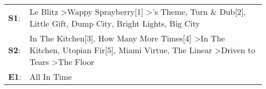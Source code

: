 \begin{supertabular}{p{0.03\textwidth}p{0.92\textwidth}}
 \textbf{S1}:  &                                                              Le Blitz\textsuperscript{} \textgreater \enspace Wappy Sprayberry[1]\textsuperscript{} \textgreater {}'s Theme\textsuperscript{}, \enspace Turn \& Dub[2]\textsuperscript{}, \enspace Little Gift\textsuperscript{}, \enspace Dump City\textsuperscript{}, \enspace Bright Lights, Big City\textsuperscript{}  \enspace  \\
 \textbf{S2}:  &  In The Kitchen[3]\textsuperscript{}, \enspace How Many More Times[4]\textsuperscript{} \textgreater \enspace In The Kitchen\textsuperscript{}, \enspace Utopian Fir[5]\textsuperscript{}, \enspace Miami Virtue\textsuperscript{}, \enspace The Linear\textsuperscript{} \textgreater \enspace Driven to Tears\textsuperscript{} \textgreater \enspace The Floor\textsuperscript{}  \enspace  \\
 \textbf{E1}:  &                                                                                                                                                                                                                                                                                                                                                       All In Time\textsuperscript{}  \enspace  \\
\end{supertabular}
